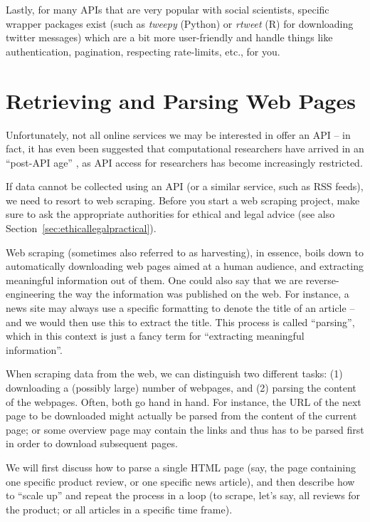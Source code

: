 Lastly, for many APIs that are very popular with social
scientists, specific wrapper packages exist (such as \emph{tweepy} (Python) or \emph{rtweet} (R) for downloading twitter messages)
which are a bit more user-friendly and handle things like authentication, pagination,
respecting rate-limits, etc., for you.


%

\section{Retrieving and Parsing Web Pages}
\label{sec:webpages}

Unfortunately, not all online services we may be interested in offer
an API -- in fact, it has even been suggested that computational
researchers have arrived in an ``post-API age'' \citep{Freelon2018}, as
API access for researchers has become increasingly restricted.

If data cannot be collected using an API (or a similar service, such
as RSS feeds), we need to resort to web scraping. Before you start a
web scraping project, make sure to ask the appropriate  authorities for
ethical and legal advice (see also Section~\ref{sec:ethicallegalpractical}).

Web scraping (sometimes also referred to as harvesting), in essence,
boils down to automatically downloading web pages aimed at a human
audience, and extracting meaningful information out of them. One could
also say that we are reverse-engineering the way the information was
published on the web. For instance, a news site may always use a
specific formatting to denote the title of an article -- and we would
then use this to extract the title. This process is called ``parsing'',
which in this context is just a fancy term for ``extracting meaningful
information''.

When scraping data from the web, we can distinguish two different
tasks: (1) downloading a (possibly large) number of webpages, and (2)
parsing the content of the webpages. Often, both go hand in
hand. For instance, the URL of the next page to be downloaded might
actually be parsed from the content of the current page; or some
overview page may contain the links and thus has to be parsed first in
order to download subsequent pages.

We will first discuss how to parse a single HTML page (say, the page
containing one specific product review, or one specific news article),
and then describe how to ``scale up'' and repeat the process in a
loop (to scrape, let's say, all reviews for the product; or all
articles in a specific time frame).




